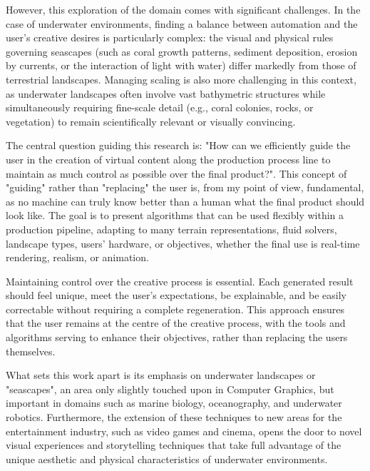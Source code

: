 However, this exploration of the domain comes with significant challenges. In the case of underwater environments, finding a balance between automation and the user's creative desires is particularly complex: the visual and physical rules governing seascapes (such as coral growth patterns, sediment deposition, erosion by currents, or the interaction of light with water) differ markedly from those of terrestrial landscapes. Managing scaling is also more challenging in this context, as underwater landscapes often involve vast bathymetric structures while simultaneously requiring fine-scale detail (e.g., coral colonies, rocks, or vegetation) to remain scientifically relevant or visually convincing.

The central question guiding this research is: "How can we efficiently guide the user in the creation of virtual content along the production process line to maintain as much control as possible over the final product?". This concept of "guiding" rather than "replacing" the user is, from my point of view, fundamental, as no machine can truly know better than a human what the final product should look like. The goal is to present algorithms that can be used flexibly within a production pipeline, adapting to many terrain representations, fluid solvers, landscape types, users' hardware, or objectives, whether the final use is real-time rendering, realism, or animation.

Maintaining control over the creative process is essential. Each generated result should feel unique, meet the user's expectations, be explainable, and be easily correctable without requiring a complete regeneration. This approach ensures that the user remains at the centre of the creative process, with the tools and algorithms serving to enhance their objectives, rather than replacing the users themselves.

What sets this work apart is its emphasis on underwater landscapes or "seascapes", an area only slightly touched upon in Computer Graphics, but important in domains such as marine biology, oceanography, and underwater robotics. Furthermore, the extension of these techniques to new areas for the entertainment industry, such as video games and cinema, opens the door to novel visual experiences and storytelling techniques that take full advantage of the unique aesthetic and physical characteristics of underwater environments.




